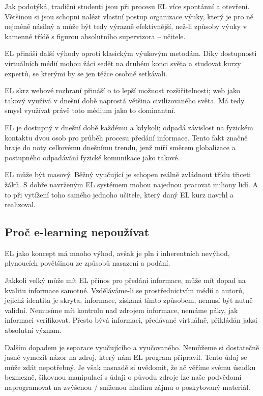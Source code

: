Jak \cite{fongling_2006} podotýká, tradiční studenti jsou při procesu EL více spontánní a otevření. Většinou si jsou schopni nalézt vlastní postup organizace výuky, který je pro ně nejméně násilný a může být tedy výrazně efektivnější, než-li způsoby výuky v kamenné třídě s figurou absolutního supervizora -- učitele.

EL přináší další výhody oproti klasickým výukovým metodám. Díky dostupnosti virtuálních médií mohou žáci sedět na druhém konci světa a studovat kurzy expertů, se kterými by se jen těžce osobně setkávali.

EL skrz webové rozhraní přináší o to lepší možnost rozšiřitelnosti; web jako takový využívá v dnešní době naprostá většina civilizovaného světa. Má tedy smysl využívat právě toto médium jako to dominantní.

EL je dostupný v dnešní době každému a kdykoli; odpadá závislost na fyzickém kontaktu dvou osob pro průběh procesu předání informace. Tento fakt značně hraje do noty celkovému dnešnímu trendu, jenž míří směrem globalizace a postupného odpadávání fyzické komunikace jako takové.

EL může být masový. Běžný vyučující je schopen reálně zvládnout třídu třiceti žáků. S dobře navrženým EL systémem mohou najednou pracovat miliony lidí. A to při vytížení toho samého jednoho učitele, který daný EL kurz navrhl a realizoval.

\subsection{Proč e-learning nepoužívat}

EL jako koncept má mnoho výhod, avšak je pln i inherentních nevýhod, plynoucích povětšinou ze způsobů nasazení a podání.

Jakkoli velký může mít EL přínos pro předání informace, může mít dopad na kvalitu informace samotné. Vzděláváme-li se prostřednictvím médií a autorů, jejichž identita je skryta, informace, získaná tímto způsobem, nemusí být nutně validní. Nemusíme mít kontrolu nad zdrojem informace, nemáme páky, jak informaci verifikovat. Přesto bývá informaci, předávané virtuálně, přikládán jaksi absolutní význam.

Dalším dopadem je separace vyučujícího a vyučovaného. Nemůžeme si dostatečně jasně vymezit názor na zdroj, který nám EL program připravil. Tento údaj se může zdát nepotřebný. Je však nasnadě si uvědomit, že ač věříme svému úsudku bezmezně, šikovnou manipulací s údaji o původu zdroje lze naše podvědomí naprogramovat na zvýšenou / sníženou hladinu zájmu o poskytovaný materiál.

